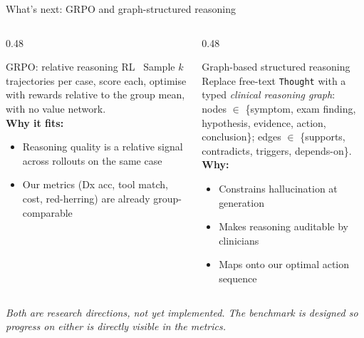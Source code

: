 \documentclass[aspectratio=169,t]{beamer}
\begin{document}
\begin{frame}{What's next: GRPO and graph-structured reasoning}
  \begin{columns}[T,onlytextwidth]
    \begin{column}{0.48\textwidth}
      \begin{block}{GRPO: relative reasoning RL~\cite{shao2024grpo}}
        \footnotesize
        Sample $k$ trajectories per case, score each, optimise with
        rewards relative to the group mean, with no value network.\\[1mm]
        \textbf{Why it fits:}
        \begin{itemize}\setlength\itemsep{0.05em}
          \item Reasoning quality is a \alert{relative} signal across
                rollouts on the same case
          \item Our metrics (Dx acc, tool match, cost, red-herring)
                are already group-comparable
        \end{itemize}
      \end{block}
    \end{column}%
    \hfill
    \begin{column}{0.48\textwidth}
      \begin{exampleblock}{Graph-based structured reasoning}
        \footnotesize
        Replace free-text \texttt{Thought} with a typed
        \emph{clinical reasoning graph}:\\[0.5mm]
        nodes $\in$ \{symptom, exam finding, hypothesis, evidence,
        action, conclusion\}; edges $\in$ \{supports, contradicts,
        triggers, depends-on\}.\\[1mm]
        \textbf{Why:}
        \begin{itemize}\setlength\itemsep{0.05em}
          \item Constrains hallucination at generation
          \item Makes reasoning \alert{auditable} by clinicians
          \item Maps onto our optimal action sequence
        \end{itemize}
      \end{exampleblock}
    \end{column}
  \end{columns}

  \vspace{0.5mm}
  \centering\scriptsize\itshape
  Both are research directions, not yet implemented. The benchmark is
  designed so progress on either is directly visible in the metrics.
\end{frame}
\end{document}

